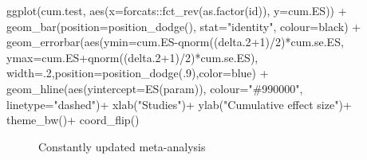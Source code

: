 \documentclass[
]{book}
\newenvironment{Shaded}{\begin{snugshade}}{\end{snugshade}}
\newcommand{\AttributeTok}[1]{\textcolor[rgb]{0.77,0.63,0.00}{#1}}
\newcommand{\DecValTok}[1]{\textcolor[rgb]{0.00,0.00,0.81}{#1}}
\newcommand{\FloatTok}[1]{\textcolor[rgb]{0.00,0.00,0.81}{#1}}
\newcommand{\FunctionTok}[1]{\textcolor[rgb]{0.00,0.00,0.00}{#1}}
\newcommand{\NormalTok}[1]{#1}
\newcommand{\SpecialCharTok}[1]{\textcolor[rgb]{0.00,0.00,0.00}{#1}}
\newcommand{\StringTok}[1]{\textcolor[rgb]{0.31,0.60,0.02}{#1}}
\theoremstyle{definition}
\theoremstyle{definition}
\theoremstyle{definition}
\theoremstyle{definition}
\theoremstyle{remark}
\begin{document}
\begin{Shaded}
\begin{Highlighting}[]
  \FunctionTok{ggplot}\NormalTok{(cum.test, }\FunctionTok{aes}\NormalTok{(}\AttributeTok{x=}\NormalTok{forcats}\SpecialCharTok{::}\FunctionTok{fct\_rev}\NormalTok{(}\FunctionTok{as.factor}\NormalTok{(id)), }\AttributeTok{y=}\NormalTok{cum.ES)) }\SpecialCharTok{+}
      \FunctionTok{geom\_bar}\NormalTok{(}\AttributeTok{position=}\FunctionTok{position\_dodge}\NormalTok{(), }\AttributeTok{stat=}\StringTok{"identity"}\NormalTok{, }\AttributeTok{colour=}\StringTok{\textquotesingle{}black\textquotesingle{}}\NormalTok{) }\SpecialCharTok{+}
      \FunctionTok{geom\_errorbar}\NormalTok{(}\FunctionTok{aes}\NormalTok{(}\AttributeTok{ymin=}\NormalTok{cum.ES}\SpecialCharTok{{-}}\FunctionTok{qnorm}\NormalTok{((delta}\FloatTok{.2}\SpecialCharTok{+}\DecValTok{1}\NormalTok{)}\SpecialCharTok{/}\DecValTok{2}\NormalTok{)}\SpecialCharTok{*}\NormalTok{cum.se.ES, }\AttributeTok{ymax=}\NormalTok{cum.ES}\SpecialCharTok{+}\FunctionTok{qnorm}\NormalTok{((delta}\FloatTok{.2}\SpecialCharTok{+}\DecValTok{1}\NormalTok{)}\SpecialCharTok{/}\DecValTok{2}\NormalTok{)}\SpecialCharTok{*}\NormalTok{cum.se.ES), }\AttributeTok{width=}\NormalTok{.}\DecValTok{2}\NormalTok{,}\AttributeTok{position=}\FunctionTok{position\_dodge}\NormalTok{(.}\DecValTok{9}\NormalTok{),}\AttributeTok{color=}\StringTok{\textquotesingle{}blue\textquotesingle{}}\NormalTok{) }\SpecialCharTok{+}
      \FunctionTok{geom\_hline}\NormalTok{(}\FunctionTok{aes}\NormalTok{(}\AttributeTok{yintercept=}\FunctionTok{ES}\NormalTok{(param)), }\AttributeTok{colour=}\StringTok{"\#990000"}\NormalTok{, }\AttributeTok{linetype=}\StringTok{"dashed"}\NormalTok{)}\SpecialCharTok{+}
      \FunctionTok{xlab}\NormalTok{(}\StringTok{"Studies"}\NormalTok{)}\SpecialCharTok{+}
      \FunctionTok{ylab}\NormalTok{(}\StringTok{"Cumulative effect size"}\NormalTok{)}\SpecialCharTok{+}
      \FunctionTok{theme\_bw}\NormalTok{()}\SpecialCharTok{+}
      \FunctionTok{coord\_flip}\NormalTok{()}
\end{Highlighting}
\end{Shaded}

\begin{figure}[htbp]

{\centering {}

}

\caption{Constantly updated meta-analysis}\label{fig:cumWMAE}
\end{figure}
\end{document}
